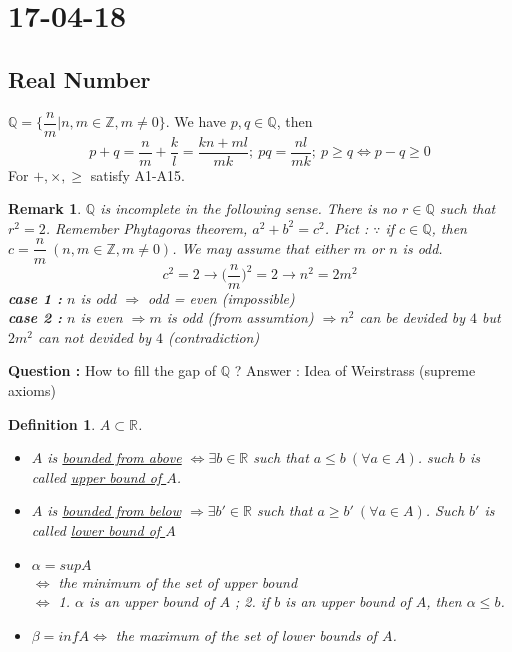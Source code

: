 \documentclass[a4paper,10pt]{article}
\newtheorem{remark}{Remark}
\newtheorem{defi}{Definition}
\newcommand{\R}{\mathbb{R}}
\newcommand{\Z}{\mathbb{Z}}
\newcommand{\Q}{\mathbb{Q}}
\begin{document}
\newpage
\section{17-04-18}

\subsection{Real Number}
$ \Q = \{ \dfrac{n}{m} | n,m \in \Z, m \neq 0 \} $. We have $ p,q \in \Q $, then
\[ p+q = \dfrac{n}{m} +\dfrac{k}{l} = \dfrac{kn + ml}{mk}; \ pq= \dfrac{nl}{mk}; \ p \geq q \Leftrightarrow p-q \geq 0 \]
For $ +, \times, \geq $ satisfy A1-A15.

\begin{remark}
	$ \Q $ is incomplete in the following sense. There is no $ r \in \Q$ such that $ r^2=2 $. Remember Phytagoras theorem, $ a^2+b^2=c^2 $. Pict : \vspace{2cm}
	$ \because $ if $ c \in \Q $, then $ c=\dfrac{n}{m} \ (n,m \in \Z, m \neq 0) $. We may assume that either $ m $ or $ n $ is odd.
	\[ c^2=2 \rightarrow \big(\dfrac{n}{m}\big)^2 =2 \rightarrow n^2=2m^2 \]
	\textbf{case 1 :} $ n $ is odd $ \Rightarrow $ odd = even (impossible)\\
	\textbf{case 2 :} $ n $  is even $ \Rightarrow m $ is odd (from assumtion) $ \Rightarrow n^2 $ can be devided by $ 4 $ but $ 2m^2 $ can not devided by $ 4 $ (contradiction)
\end{remark}

\textbf{Question :} How to fill the gap of $ \Q $ ? Answer : Idea of Weirstrass (supreme axioms)

\begin{defi}
	$ A \subset \R $.
	\begin{itemize}
		\item $ A $ is \underline{bounded from above} $ \Leftrightarrow \exists b\in\R $ such that $ a \leq b \ (\forall a\in A) $. such $ b $ is called \underline{upper bound of $ A $}.
		\item $ A $ is \underline{bounded from below} $ \Rightarrow \exists b\prime \in\R $ such that $ a \geq b\prime \ (\forall a \in A) $. Such $ b\prime $ is called \underline{lower bound of $ A $}
		\item $ \alpha = sup A $\\
		$ \Leftrightarrow $ the minimum of the set of upper bound\\
		$ \Leftrightarrow $ 1. $ \alpha $ is an upper bound of $ A $ ; 2. if $ b $ is an upper bound of $ A $, then $ \alpha \leq b $.
		\item $ \beta = inf A \Leftrightarrow $ the maximum of the set of lower bounds of $ A $.
	\end{itemize}
\end{defi}
\end{document}
